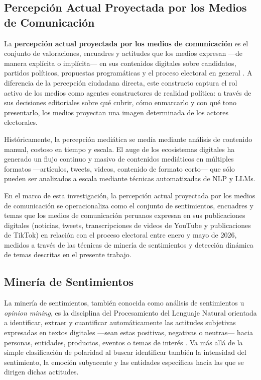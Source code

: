 \subsection{Percepción Actual Proyectada por los Medios de Comunicación}

La \textbf{percepción actual proyectada por los medios de comunicación} es el conjunto de valoraciones, encuadres y actitudes que los medios expresan —de manera explícita o implícita— en sus contenidos digitales sobre candidatos, partidos políticos, propuestas programáticas y el proceso electoral en general \parencite{mc_lippmann1922public}. A diferencia de la percepción ciudadana directa, este constructo captura el rol activo de los medios como agentes constructores de realidad política: a través de sus decisiones editoriales sobre qué cubrir, cómo enmarcarlo y con qué tono presentarlo, los medios proyectan una imagen determinada de los actores electorales.

Históricamente, la percepción mediática se medía mediante análisis de contenido manual, costoso en tiempo y escala. El auge de los ecosistemas digitales ha generado un flujo continuo y masivo de contenidos mediáticos en múltiples formatos —artículos, tweets, videos, contenido de formato corto— que sólo pueden ser analizados a escala mediante técnicas automatizadas de NLP y LLMs.

En el marco de esta investigación, la percepción actual proyectada por los medios de comunicación se operacionaliza como el conjunto de sentimientos, encuadres y temas que los medios de comunicación peruanos expresan en sus publicaciones digitales (noticias, tweets, transcripciones de videos de YouTube y publicaciones de TikTok) en relación con el proceso electoral entre enero y mayo de 2026, medidos a través de las técnicas de minería de sentimientos y detección dinámica de temas descritas en el presente trabajo.

\subsection{Minería de Sentimientos}

La minería de sentimientos, también conocida como análisis de sentimientos u \textit{opinion mining}, es la disciplina del Procesamiento del Lenguaje Natural orientada a identificar, extraer y cuantificar automáticamente las actitudes subjetivas expresadas en textos digitales —sean estas positivas, negativas o neutras— hacia personas, entidades, productos, eventos o temas de interés \parencite{tec_liu2012sentiment}. Va más allá de la simple clasificación de polaridad al buscar identificar también la intensidad del sentimiento, la emoción subyacente y las entidades específicas hacia las que se dirigen dichas actitudes.

